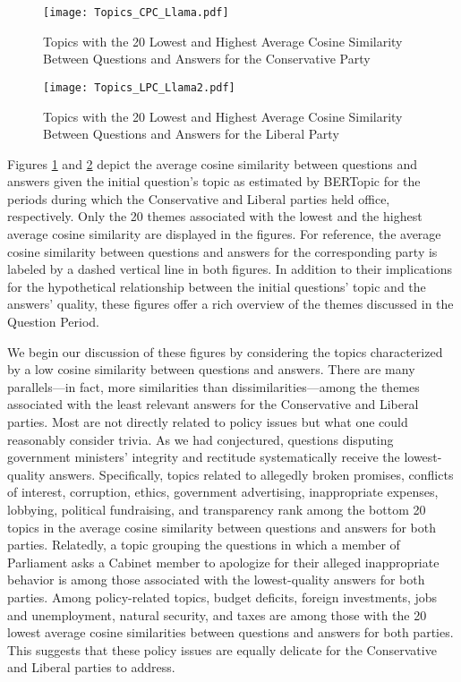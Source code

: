 {{\begin{figure}[!p]
    \centering
    \texttt{[image: Topics\_CPC\_Llama.pdf]}
    \caption{Topics with the 20 Lowest and Highest Average Cosine Similarity Between Questions and Answers for the Conservative Party}
    \label{fig:topics_CPC}
\end{figure}

\begin{figure}[!p]
    \centering
    \texttt{[image: Topics\_LPC\_Llama2.pdf]}
    \caption{Topics with the 20 Lowest and Highest Average Cosine Similarity Between Questions and Answers for the Liberal Party}
    \label{fig:topics_LPC}
\end{figure}

Figures \ref{fig:topics_CPC} and \ref{fig:topics_LPC} depict the average cosine similarity between questions and answers given the initial question’s topic as estimated by BERTopic for the periods during which the Conservative and Liberal parties held office, respectively. Only the 20 themes associated with the lowest and the highest average cosine similarity are displayed in the figures. For reference, the average cosine similarity between questions and answers for the corresponding party is labeled by a dashed vertical line in both figures. In addition to their implications for the hypothetical relationship between the initial questions’ topic and the answers’ quality, these figures offer a rich overview of the themes discussed in the Question Period.

We begin our discussion of these figures by considering the topics characterized by a low cosine similarity between questions and answers. There are many parallels---in fact, more similarities than dissimilarities---among the themes associated with the least relevant answers for the Conservative and Liberal parties. Most are not directly related to policy issues but what one could reasonably consider trivia. As we had conjectured, questions disputing government ministers’ integrity and rectitude systematically receive the lowest-quality answers. Specifically, topics related to allegedly broken promises, conflicts of interest, corruption, ethics, government advertising, inappropriate expenses, lobbying, political fundraising, and transparency rank among the bottom 20 topics in the average cosine similarity between questions and answers for both parties. Relatedly, a topic grouping the questions in which a member of Parliament asks a Cabinet member to apologize for their alleged inappropriate behavior is among those associated with the lowest-quality answers for both parties. Among policy-related topics, budget deficits, foreign investments, jobs and unemployment, natural security, and taxes are among those with the 20 lowest average cosine similarities between questions and answers for both parties. This suggests that these policy issues are equally delicate for the Conservative and Liberal parties to address.

}}
